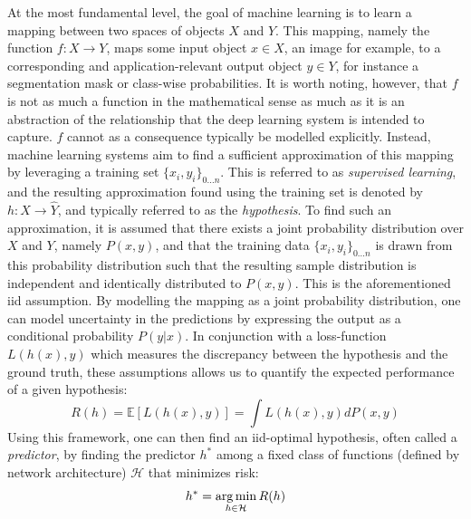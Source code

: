 		At the most fundamental level, the goal of machine learning is to learn a mapping between two spaces of objects \(X\) and \(Y\). This mapping, namely the function \(f: X \rightarrow Y\), maps some input object \(x \in X\), an image for example, to a corresponding and application-relevant output object \(y \in Y\), for instance a segmentation mask or class-wise probabilities. It is worth noting, however, that \(f\) is not as much a function in the mathematical sense as much as it is an abstraction of the relationship that the deep learning system is intended to capture. \(f\) cannot as a consequence typically be modelled explicitly. Instead, machine learning systems aim to find a sufficient approximation of this mapping by leveraging a training set \(\{x_i, y_i\}_{0...n}\). This is referred to as \textit{supervised learning}, and the resulting approximation found using the training set is denoted by \(h: X \rightarrow \hat{Y}\), and typically referred to as the \textit{hypothesis}.  
		To find such an approximation, it is assumed that there exists a joint probability distribution over \(X\) and \(Y\), namely \(P(x,y)\), and that the training data \(\{x_i, y_i\}_{0...n}\) is drawn from this probability distribution such that the resulting sample distribution is independent and identically distributed to \(P(x,y)\). This is the aforementioned \gls{iid} assumption. By modelling the mapping as a joint probability distribution, one can model uncertainty in the predictions by expressing the output as a conditional probability \(P(y|x)\). In conjunction with a loss-function \(L(h(x),y)\) which measures the discrepancy between the hypothesis and the ground truth, these assumptions allows us to quantify the expected performance of a given hypothesis:
		\begin{equation}
		    R(h) = \mathbb{E}[L(h(x),y)] = \int L(h(x),y) dP(x,y)
		\end{equation}
		Using this framework, one can then find an \gls{iid}-optimal hypothesis, often called a \textit{predictor}, by finding the predictor \(h^*\) among a fixed class of functions (defined by network architecture) \(\mathcal{H}\) that minimizes risk:
		\begin{equation}
		h^* = \operatorname*{arg\,min}_{h \in \mathcal{H}}R(h)
		\end{equation}
		
